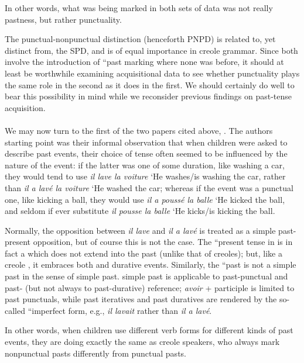 \noindent In other words, what was being marked in both sets of data was not really pastness, but rather punctuality.

The punctual-nonpunctual distinction (henceforth PNPD) is related to, yet distinct from, the SPD, and is of equal importance in creole grammar. Since both   involve the introduction of ``past marking where none was before, it should at least be worthwhile examining acquisitional data to see whether punctuality plays the same role in the second as it does in the first. We should certainly do well to bear this possibility in mind while we reconsider previous findings on past-tense acquisition.\\\\

We may now turn to the first of the two papers cited above, \citet{BrockartEtAl1973}. The authors starting point was their informal observation that when children were asked to describe past events, their choice of tense often seemed to be influenced by the nature of the event: if the latter was one of some duration, like washing a car, they would tend to use \textit{il lave la voiture} `He washes/is washing the car, rather than \textit{il a lav\'e la voiture} `He washed the car; whereas if the event was a punctual one, like kicking a ball, they would use \textit{il a pouss\'e la balle} `He kicked the ball, and seldom if ever substitute \textit{il pousse la balle} `He kicks/is kicking the ball.

Normally, the opposition between \textit{il lave} and \textit{il a lav\'e} is treated as a simple past-present opposition, but of course this is not the case. The ``present tense in  is in fact a  which does not extend into the past (unlike that of creoles); but, like a creole , it embraces both  and durative events.
Similarly, the ``past is not a simple past in the sense of  simple past.  simple past is applicable to past-punctual and past- (but not always to past-durative) reference;  \textit{avoir} + participle is limited to past punctuals, while past iteratives and past duratives are rendered by the so-called ``imperfect form, e.g., \textit{il lavait} rather than \textit{il a lav\'e}.

In other words, when  children use different verb forms for different kinds of past events, they are doing exactly the same as creole speakers, who always mark nonpunctual pasts differently from punctual pasts.

